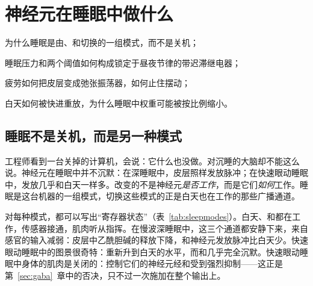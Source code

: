 \chapter{神经元在睡眠中做什么}
\label{sec:sleep}
\begin{chaptergoals}
\item 为什么睡眠是由、和切换的一组模式，而不是关机；
\item 睡眠压力和两个阈值如何构成锁定于昼夜节律的带迟滞继电器；
\item 疲劳如何把皮层变成弛张振荡器，如何止住摆动；
\item 白天如何被快进重放，为什么睡眠中权重可能被按比例缩小。
\end{chaptergoals}

\section{睡眠不是关机，而是另一种模式}

工程师看到一台关掉的计算机，会说：它什么也没做。对沉睡的大脑却不能这么说。神经元在睡眠中并不沉默：在深睡眠中，皮层照样发放脉冲；在快速眼动睡眠中，发放几乎和白天一样多。改变的不是神经元\emph{是否工作}，而是它们\emph{如何}工作。睡眠是这台机器的一组模式，切换这些模式的正是白天也在工作的那些广播通道。

对每种模式，都可以写出“寄存器状态”（表~\ref{tab:sleepmodes}）。白天、和都在工作，传感器接通，肌肉听从指挥。在慢波深睡眠中，这三个通道都安静下来，来自感官的输入减弱\cite{Hasselmo1999}：皮层中乙酰胆碱的释放下降，和神经元发放脉冲比白天少\cite{Marrosu1995,AstonJonesBloom1981,McGintyHarper1976}。快速眼动睡眠中的图景很奇特：重新升到白天的水平\cite{Marrosu1995}，而和几乎完全沉默\cite{AstonJonesBloom1981,McGintyHarper1976,JacobsAzmitia1992}。快速眼动睡眠中身体的肌肉是关闭的：控制它们的神经元经和受到强烈抑制\cite{BrooksPeever2012}——这正是第~\ref{sec:gaba}~章中的否决，只不过一次施加在整个输出上。

